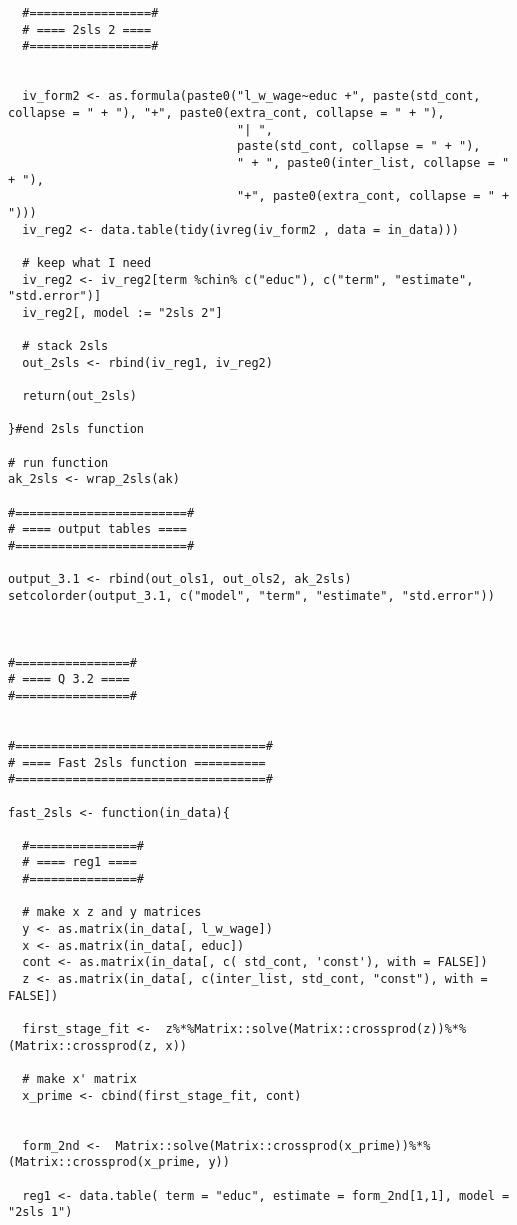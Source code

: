 \documentclass[12pt]{article}
\begin{document}
\begin{verbatim}
  #=================#
  # ==== 2sls 2 ====
  #=================#
  
  
  iv_form2 <- as.formula(paste0("l_w_wage~educ +", paste(std_cont, collapse = " + "), "+", paste0(extra_cont, collapse = " + "),
                                "| ", 
                                paste(std_cont, collapse = " + "), 
                                " + ", paste0(inter_list, collapse = " + "), 
                                "+", paste0(extra_cont, collapse = " + ")))
  iv_reg2 <- data.table(tidy(ivreg(iv_form2 , data = in_data)))
  
  # keep what I need 
  iv_reg2 <- iv_reg2[term %chin% c("educ"), c("term", "estimate", "std.error")]
  iv_reg2[, model := "2sls 2"]
  
  # stack 2sls 
  out_2sls <- rbind(iv_reg1, iv_reg2)
  
  return(out_2sls)
  
}#end 2sls function 

# run function 
ak_2sls <- wrap_2sls(ak)

#========================#
# ==== output tables ====
#========================#

output_3.1 <- rbind(out_ols1, out_ols2, ak_2sls)
setcolorder(output_3.1, c("model", "term", "estimate", "std.error"))



#================#
# ==== Q 3.2 ====
#================#


#===================================#
# ==== Fast 2sls function ==========
#===================================#

fast_2sls <- function(in_data){
  
  #===============#
  # ==== reg1 ====
  #===============#
  
  # make x z and y matrices
  y <- as.matrix(in_data[, l_w_wage])
  x <- as.matrix(in_data[, educ])
  cont <- as.matrix(in_data[, c( std_cont, 'const'), with = FALSE])
  z <- as.matrix(in_data[, c(inter_list, std_cont, "const"), with = FALSE])
  
  first_stage_fit <-  z%*%Matrix::solve(Matrix::crossprod(z))%*%(Matrix::crossprod(z, x))
  
  # make x' matrix 
  x_prime <- cbind(first_stage_fit, cont)
  
  
  form_2nd <-  Matrix::solve(Matrix::crossprod(x_prime))%*%(Matrix::crossprod(x_prime, y))
  
  reg1 <- data.table( term = "educ", estimate = form_2nd[1,1], model = "2sls 1")
  

\end{verbatim}
\end{document}
